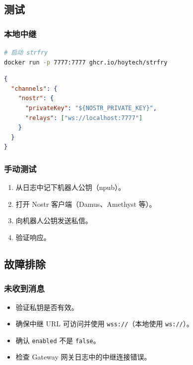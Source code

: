 \subsection{测试}


\subsubsection{本地中继}


\begin{lstlisting}[language=bash]
# 启动 strfry
docker run -p 7777:7777 ghcr.io/hoytech/strfry
\end{lstlisting}


\begin{lstlisting}[language=json]
{
  "channels": {
    "nostr": {
      "privateKey": "${NOSTR_PRIVATE_KEY}",
      "relays": ["ws://localhost:7777"]
    }
  }
}
\end{lstlisting}


\subsubsection{手动测试}


\begin{enumerate}
  \item 从日志中记下机器人公钥（npub）。
  \item 打开 Nostr 客户端（Damus、Amethyst 等）。
  \item 向机器人公钥发送私信。
  \item 验证响应。
\end{enumerate}


\subsection{故障排除}


\subsubsection{未收到消息}


\begin{itemize}
  \item 验证私钥是否有效。
  \item 确保中继 URL 可访问并使用 \texttt{wss://}（本地使用 \texttt{ws://}）。
  \item 确认 \texttt{enabled} 不是 \texttt{false}。
  \item 检查 Gateway 网关日志中的中继连接错误。
\end{itemize}


